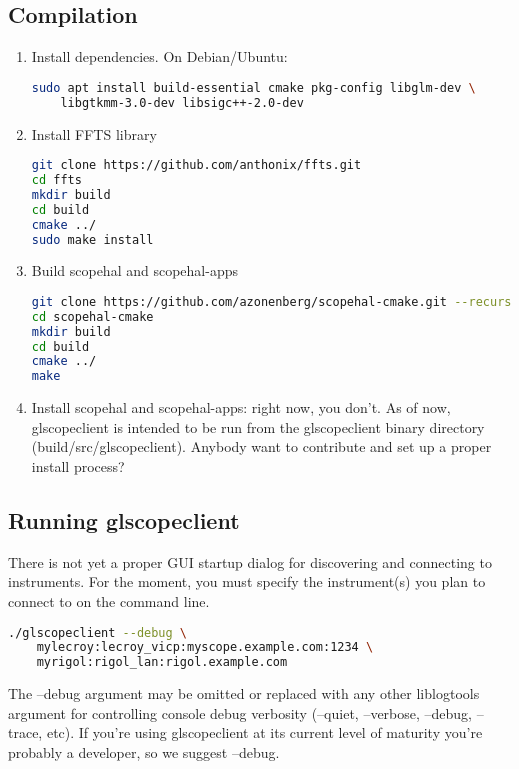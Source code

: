 \documentclass[11pt]{article}
\begin{document}
\subsection{Compilation}

\begin{enumerate}

\item Install dependencies. On Debian/Ubuntu:
\begin{lstlisting}[language=sh]
sudo apt install build-essential cmake pkg-config libglm-dev \
	libgtkmm-3.0-dev libsigc++-2.0-dev
\end{lstlisting}

\item Install FFTS library
\begin{lstlisting}[language=sh]
git clone https://github.com/anthonix/ffts.git
cd ffts
mkdir build
cd build
cmake ../
sudo make install
\end{lstlisting}

\item Build scopehal and scopehal-apps
\begin{lstlisting}[language=sh]
git clone https://github.com/azonenberg/scopehal-cmake.git --recurse-submodules
cd scopehal-cmake
mkdir build
cd build
cmake ../
make
\end{lstlisting}

\item Install scopehal and scopehal-apps: right now, you don't. As of now, glscopeclient is intended to be run from the
glscopeclient binary directory (build/src/glscopeclient). Anybody want to contribute and set up a proper install
process?

\end{enumerate}

\subsection{Running glscopeclient}

There is not yet a proper GUI startup dialog for discovering and connecting to instruments. For the moment, you must
specify the instrument(s) you plan to connect to on the command line.

\begin{lstlisting}[language=sh]
./glscopeclient --debug \
	mylecroy:lecroy_vicp:myscope.example.com:1234 \
	myrigol:rigol_lan:rigol.example.com
\end{lstlisting}

The --debug argument may be omitted or replaced with any other liblogtools argument for controlling console debug
verbosity (--quiet, --verbose, --debug, --trace, etc). If you're using glscopeclient at its current level of maturity
you're probably a developer, so we suggest --debug.
\end{document}
